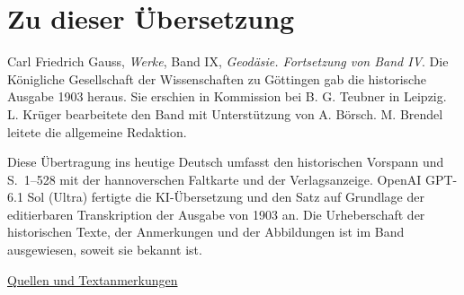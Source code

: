 \section*{Zu dieser Übersetzung}
\noindent Carl Friedrich Gauss, \textit{Werke}, Band IX, \textit{Geodäsie. Fortsetzung von Band IV}. Die Königliche Gesellschaft der Wissenschaften zu Göttingen gab die historische Ausgabe 1903 heraus. Sie erschien in Kommission bei B. G. Teubner in Leipzig. L. Krüger bearbeitete den Band mit Unterstützung von A. Börsch. M. Brendel leitete die allgemeine Redaktion.

Diese Übertragung ins heutige Deutsch umfasst den historischen Vorspann und S.~1--528 mit der hannoverschen Faltkarte und der Verlagsanzeige. OpenAI GPT-6.1 Sol (Ultra) fertigte die KI-Übersetzung und den Satz auf Grundlage der editierbaren Transkription der Ausgabe von 1903 an. Die Urheberschaft der historischen Texte, der Anmerkungen und der Abbildungen ist im Band ausgewiesen, soweit sie bekannt ist.

\noindent\hyperlink{gaussix-sources}{Quellen und Textanmerkungen}
